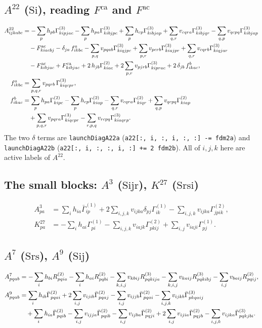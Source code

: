 \documentclass[11pt]{article}
\newcommand{\code}[1]{\texttt{#1}}
\newcommand{\G}[1]{\Gamma^{(#1)}}
\newcommand{\Gb}[1]{\bar\Gamma^{(#1)}}
\newcommand{\Fca}{F^{\mathrm{ca}}}
\newcommand{\Fac}{F^{\mathrm{ac}}}
\newcommand{\cls}[1]{\ensuremath{\mathrm{#1}}}
\begin{document}
\subsection{\texorpdfstring{$A^{22}$ (\cls{Si}), reading $\Fca$ and $\Fac$}{A22 (Si), reading f3ca and f3ac}}
\begin{align}
A^{22}_{ijkabc} &= -\sum_{p} h_{pb}\G3_{kipjac} - \sum_{p} h_{pa}\G3_{kibjpc}
   + \sum_{p} h_{cp}\G3_{kibjap}
   + \sum_{q,r} v_{cqra}\G3_{kibjqr} - \sum_{q,p} v_{qcpq}\G3_{kibjap} \notag\\
 &\quad - \Fac_{kiacbj} - \delta_{ja}\,f^{a}_{ikbc}
   - \sum_{p,q} v_{pqab}\G3_{kiqjpc} + \sum_{p,r} v_{pcrb}\G3_{kiajpr}
   + \sum_{q,r} v_{cqrb}\G3_{kiqjar} \notag\\
 &\quad - \Fac_{kibjac} + \Fca_{kibjac} + 2\,h_{jb}\G2_{kiac}
   + 2\sum_{p,r} v_{pjrb}\G3_{kiprac} + 2\,\delta_{jb}\,f^{b}_{ikac}, \\
f^{a}_{ikbc} &= \sum_{p,q,r} v_{pqrb}\,\G3_{kiqcpr}, \\
f^{b}_{ikac} &= \sum_{p} h_{pa}\G2_{kipc} - \sum_{p} h_{cp}\G2_{kiap}
   - \sum_{q,r} v_{cqra}\G2_{kiqr} + \sum_{q,p} v_{qcpq}\G2_{kiap} \notag\\
 &\quad + \sum_{p,q,r} v_{pqra}\G3_{kiqcpr} - \sum_{r,p,q} v_{rcpq}\G3_{kiaqrp}.
\end{align}
The two $\delta$ terms are \code{launchDiagA22a}
(\code{a22[:, i, :, i, :, :] -= fdm2a}) and \code{launchDiagA22b}
(\code{a22[:, i, :, :, i, :] += 2 fdm2b}). All of $i,j,k$ here are active
labels of $A^{22}$.

\subsection{\texorpdfstring{The small blocks: $A^3$ (\cls{Sijr}), $K^{27}$ (\cls{Srsi})}{The small blocks: A3 (Sijr), K27 (Srsi)}}
\begin{align}
A^{3}_{pa} &= \sum_{i} h_{ia}\Gb1_{ip} + 2\sum_{i,j,k} v_{ijka}\delta_{pj}\G1_{ik}
   - \sum_{i,j,k} v_{ijka}\G2_{jpik}, \\
K^{27}_{pa} &= -\sum_{i} h_{ai}\G1_{pi} - \sum_{i,j,k} v_{iajk}\G2_{pkij}
   + \sum_{i,j} v_{iaji}\G1_{pj}.
\end{align}

\subsection{\texorpdfstring{$A^7$ (\cls{Srs}), $A^9$ (\cls{Sij})}{A7 (Srs), A9 (Sij)}}
\begin{align}
A^{7}_{pqab} &= -\sum_{i} h_{bi}R^{(2)}_{pqia} - \sum_{i} h_{ai}R^{(2)}_{pqbi}
   - \sum_{k,i,j} v_{kbij}R^{(3)}_{pqkija}
   - \sum_{k,i,j} v_{kaij}R^{(3)}_{pqkibj} - \sum_{i,j} v_{baij}R^{(2)}_{pqij}, \\
A^{9}_{pqab} &= \sum_{i} h_{ib}\Gb2_{pqai} + 2\sum_{i,j} v_{ijib}\Gb2_{pqaj}
   - \sum_{i,j} v_{ijjb}\Gb2_{pqai} - \sum_{i,j,k} v_{ijkb}\Gb3_{pkqaij} \notag\\
 &\quad + \sum_{i} h_{ia}\Gb2_{pqib} - \sum_{i,j} v_{ijja}\Gb2_{pqib}
   - \sum_{i,j} v_{ijba}\Gb2_{pqji} + 2\sum_{i,j} v_{ijia}\Gb2_{pqjb}
   - \sum_{i,j,k} v_{ijka}\Gb3_{pqkjbi}.
\end{align}
\end{document}
